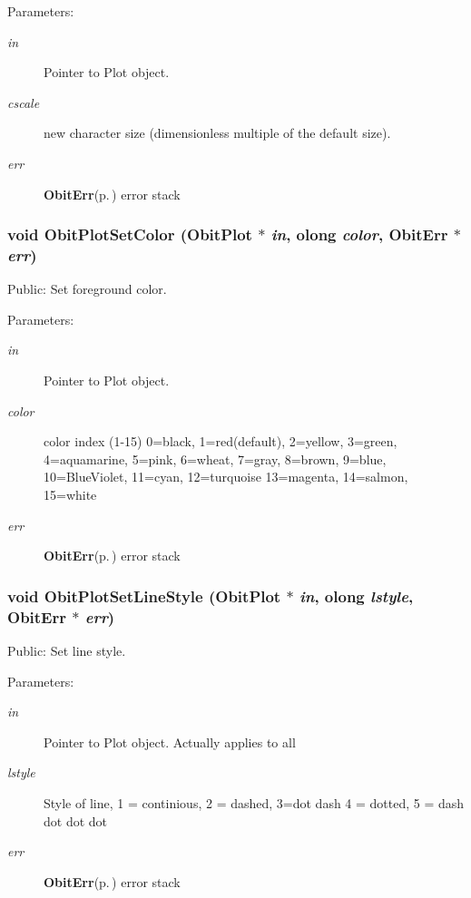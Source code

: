 \begin{Desc}
\item[Parameters:]
\begin{description}
\item[{\em in}]Pointer to Plot object. \item[{\em cscale}]new character size (dimensionless multiple of the default size). \item[{\em err}]{\bf Obit\-Err}{\rm (p.\,\pageref{structObitErr})} error stack \end{description}
\end{Desc}
\subsubsection{\setlength{\rightskip}{0pt plus 5cm}void Obit\-Plot\-Set\-Color ({\bf Obit\-Plot} $\ast$ {\em in}, {\bf olong} {\em color}, {\bf Obit\-Err} $\ast$ {\em err})}\label{ObitPlot_8c_a23}


Public: Set foreground color. 

\begin{Desc}
\item[Parameters:]
\begin{description}
\item[{\em in}]Pointer to Plot object. \item[{\em color}]color index (1-15) 0=black, 1=red(default), 2=yellow, 3=green, 4=aquamarine, 5=pink, 6=wheat, 7=gray, 8=brown, 9=blue, 10=Blue\-Violet, 11=cyan, 12=turquoise 13=magenta, 14=salmon, 15=white \item[{\em err}]{\bf Obit\-Err}{\rm (p.\,\pageref{structObitErr})} error stack \end{description}
\end{Desc}
\subsubsection{\setlength{\rightskip}{0pt plus 5cm}void Obit\-Plot\-Set\-Line\-Style ({\bf Obit\-Plot} $\ast$ {\em in}, {\bf olong} {\em lstyle}, {\bf Obit\-Err} $\ast$ {\em err})}\label{ObitPlot_8c_a22}


Public: Set line style. 

\begin{Desc}
\item[Parameters:]
\begin{description}
\item[{\em in}]Pointer to Plot object. Actually applies to all \item[{\em lstyle}]Style of line, 1 = continious, 2 = dashed, 3=dot dash 4 = dotted, 5 = dash dot dot dot \item[{\em err}]{\bf Obit\-Err}{\rm (p.\,\pageref{structObitErr})} error stack \end{description}
\end{Desc}
